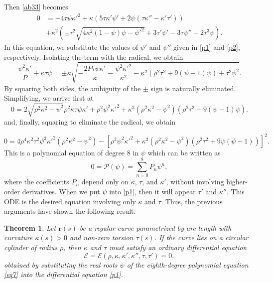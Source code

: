 \documentclass[a4paper,12pt]{amsart}
\theoremstyle{plain}
\newtheorem{theorem}{Theorem}[section]
\theoremstyle{definition}
\begin{document}
Then \eqref{ab33} becomes
\begin{equation*}
\begin{split}
0&=-4 \tau  \psi  \kappa '^2+\kappa  \left(5 \tau  \kappa ' \psi '+2\psi  \left( \tau  \kappa ''- \kappa ' \tau '\right)\right)\\
&+\kappa ^2 \left( \pm \tau ^2 \sqrt{4 \kappa ^2 (1-\psi ) \psi -\psi '^2}+3 \tau ' \psi '-3 \tau  \psi ''-2 \tau ^3 \psi \right).
\end{split}
\end{equation*}
In this equation, we substitute the values of $\psi'$ and $\psi''$ given in \eqref{p1} and \eqref{p2}, respectively. Isolating the term with the radical, we obtain
$$
\frac{\psi ^2 \kappa '}{P}+\kappa\tau\psi = \pm \kappa \sqrt{-\frac{2 P \tau  \psi  \kappa '}{\kappa }-\frac{\psi ^2 \kappa '^2}{\kappa ^2}-\kappa ^2 \left(\rho ^2 \tau ^2+9 (\psi -1) \psi \right)+\tau ^2 \psi ^2}.$$
By squaring both sides, the ambiguity of the $\pm$ sign is naturally eliminated. Simplifying, we arrive first at 
\begin{equation*}
0=2 \sqrt{\rho^2\kappa^2-\psi^2} \rho ^2 \kappa  \tau  \psi  \kappa '+\rho ^2 \psi ^2 \kappa '^2+\kappa ^2 \left(\rho ^2 \kappa ^2-\psi ^2\right) \left(\rho ^2 \tau ^2+9 (\psi -1) \psi \right).
\end{equation*}
and, finally,  squaring   to eliminate the radical, we obtain

\begin{equation}\label{eq7}
0=4 \rho^4 \kappa^2 \tau^2 \psi^2 \kappa'^2 (\rho^2 \kappa^2 - \psi^2) - \left[ \rho^2 \psi^2 \kappa'^2 + \kappa^2 (\rho^2 \kappa^2 - \psi^2) (\rho^2 \tau^2 + 9 \psi (\psi - 1)) \right]^2.
\end{equation}
This is a polynomial equation of degree $8$ in $\psi$ which can be written as 
$$0=\mathcal{P}(\psi)=\sum_{n=0}^8 P_n\psi^n,$$
where the coefficients $P_n$   depend only on $\kappa$, $\tau$, and $\kappa'$, without involving higher-order derivatives.  When we put $\psi$ into \eqref{p1}, then it will appear  $\tau'$ and $\kappa''$. This ODE is the desired equation involving only $\kappa$ and $\tau$. Thus, the previous arguments have shown the following result.

  


 
 \begin{theorem}\label{t1}
 Let $\mathbf{r}(s)$ be a regular curve parametrized by arc length with curvature $\kappa(s) > 0$ and 
 non-zero torsion $\tau(s)$. If the curve lies on a circular cylinder of radius $\rho$, 
 then $\kappa$ and $\tau$ must satisfy an ordinary differential equation 
 \begin{equation}\label{e1}
 \mathcal{E}=\mathcal{E}(\rho,\kappa,\kappa',\kappa'',\tau,\tau')=0,\end{equation}
 obtained by 
 substituting the real roots $\psi$ of the eighth-degree polynomial equation 
 \eqref{eq7} into the differential equation \eqref{p1}.
 \end{theorem}
 
\end{document}

